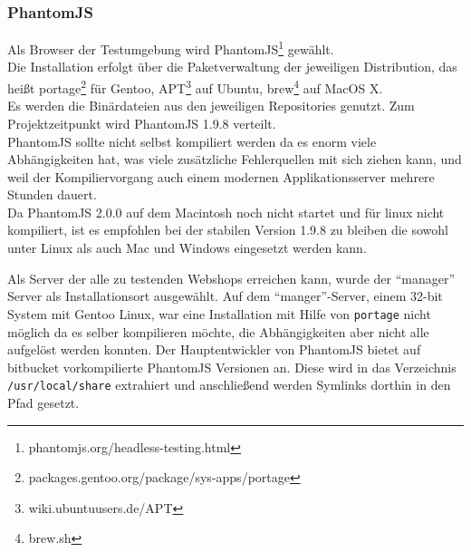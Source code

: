 


\subsubsection*{PhantomJS}\label{phantomjs}

Als Browser der Testumgebung wird PhantomJS\footnote{phantomjs.org/headless-testing.html}
gewählt.\\Die Installation erfolgt über die Paketverwaltung der
jeweiligen Distribution, das heißt portage\footnote{packages.gentoo.org/package/sys-apps/portage}
für Gentoo, APT\footnote{wiki.ubuntuusers.de/APT} auf Ubuntu,
brew\footnote{brew.sh} auf MacOS X.\\Es werden die Binärdateien aus den
jeweiligen Repositories genutzt. Zum Projektzeitpunkt wird PhantomJS
1.9.8 verteilt.\\PhantomJS sollte nicht selbst kompiliert werden da es
enorm viele Abhängigkeiten hat, was viele zusätzliche Fehlerquellen mit
sich ziehen kann, und weil der Kompiliervorgang auch einem modernen
Applikationsserver mehrere Stunden dauert.\\Da PhantomJS 2.0.0 auf dem
Macintosh noch nicht startet und für linux nicht kompiliert, ist es
empfohlen bei der stabilen Version 1.9.8 zu bleiben die sowohl unter
Linux als auch Mac und Windows eingesetzt werden kann.

Als Server der alle zu testenden Webshops erreichen kann, wurde der
``manager'' Server als Installationsort ausgewählt. Auf dem
``manger''-Server, einem 32-bit System mit Gentoo Linux, war eine
Installation mit Hilfe von \texttt{portage} nicht möglich da es selber
kompilieren möchte, die Abhängigkeiten aber nicht alle aufgelöst werden
konnten. Der Hauptentwickler von PhantomJS bietet auf bitbucket
vorkompilierte PhantomJS Versionen an. Diese wird in das Verzeichnis
\texttt{/usr/local/share} extrahiert und anschließend werden Symlinks
dorthin in den Pfad gesetzt.

